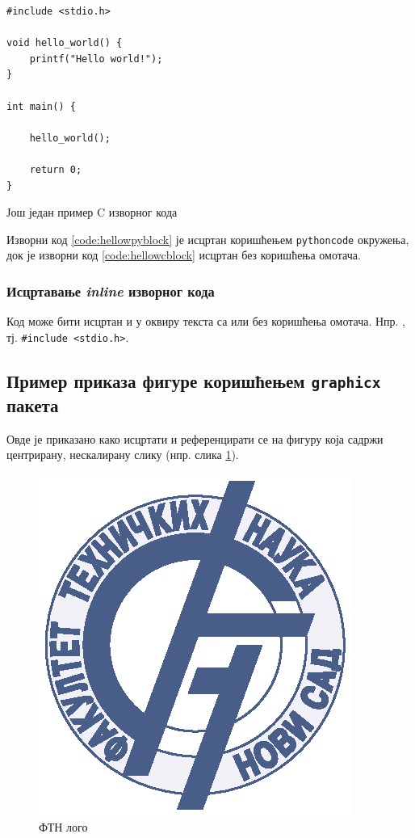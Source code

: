 \begin{listing}
\begin{verbatim}
#include <stdio.h>

void hello_world() {
    printf("Hello world!");
}

int main() {

    hello_world();

    return 0;
}
\end{verbatim}
\caption{Још један пример C изворног кода}
\label{code:hellowcblock}
\end{listing}

Изворни код \ref{code:hellowpyblock} је исцртан коришћењем \texttt{pythoncode} окружења, док је изворни код \ref{code:hellowcblock} исцртан без коришћења омотача.

\subsubsection{Исцртавање \textit{inline} изворног кода}
Код може бити исцртан и у оквиру текста са или без коришћења омотача. Нпр. , тј. \texttt{#include <stdio.h>}.

\subsection{Пример приказа фигуре коришћењем \texttt{graphicx} пакета}
Овде је приказано како исцртати и референцирати се на фигуру која садржи центрирану, нескалирану слику (нпр. слика \ref{fig:ftnlogo}).
\begin{figure}[H]
    \centering
    \includegraphics{images/ftn-logo.eps}
    \caption{ФТН лого}
    \label{fig:ftnlogo}
\end{figure}


